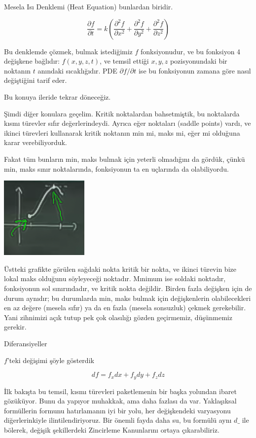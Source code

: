 \documentclass[12pt,fleqn]{article}\usepackage{../../common}
\begin{document}
Mesela Isı Denklemi (Heat Equation) bunlardan biridir. 

$$ \frac{\partial f}{\partial t}  = k (
\frac{\partial^2 f}{\partial x^2} + 
\frac{\partial^2 f}{\partial y^2} + 
\frac{\partial^2 f}{\partial z^2} )
$$

Bu denklemde çözmek, bulmak istediğimiz $f$ fonksiyonudur, ve bu
fonksiyon 4 değişkene bağlıdır: $f(x,y,z,t)$, ve temsil ettiği $x,y,z$
pozisyonundaki bir noktanın $t$ anındaki sıcaklığıdır. PDE
$\partial f/\partial t$ ise bu fonksiyonun zamana göre nasıl değiştiğini
tarif eder. 

Bu konuya ileride tekrar döneceğiz. 

Şimdi diğer konulara geçelim. Kritik noktalardan bahsetmiştik, bu
noktalarda kısmı türevler sıfır değerlerindeydi. Ayrıca eğer noktaları
(saddle points) vardı, ve ikinci türevleri kullanarak kritik noktanın min
mi, maks mi, eğer mi  olduğuna karar verebiliyorduk. 

Fakat tüm bunların min, maks bulmak için yeterli olmadığını da gördük,
çünkü min, maks sınır noktalarında, fonksiyonun ta en uçlarında da
olabiliyordu. 

\includegraphics[height=4cm]{15_1.png}

Üstteki grafikte görülen sağdaki nokta kritik bir nokta, ve ikinci türevin bize
lokal maks olduğunu söyleyeceği noktadır. Mınimum ise soldaki noktadır,
fonksiyonun sol sınırındadır, ve kritik nokta değildir. Birden fazla değişken
için de durum aynıdır; bu durumlarda min, maks bulmak için değişkenlerin
olabilecekleri en az değere (mesela sıfır) ya da en fazla (mesela sonsuzluk)
çekmek gerekebilir. Yani zihnimizi açık tutup pek çok olasılığı gözden
geçirmemiz, düşünmemiz gerekir.

Diferansiyeller 

$f$'teki değişimi şöyle gösterdik

$$ df = f_xdx + f_ydy + f_zdz  $$

İlk bakışta bu temsil, kısmı türevleri paketlemenin bir başka yolundan
ibaret gözüküyor. Bunu da yapıyor muhakkak, ama daha fazlası da
var. Yaklaşıksal formüllerin formunu hatırlamanın iyi bir yolu, her
değişkendeki varyasyonu diğerlerinkiyle ilintilendiriyoruz. Bir önemli
fayda daha su, bu formülü aynı $d\_$ ile bölerek, değişik şekillerdeki
Zincirleme Kanunlarını ortaya çıkarabiliriz. 
\end{document}
